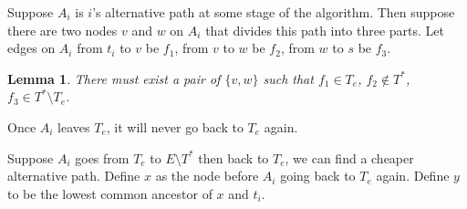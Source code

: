 \documentclass[11pt,psfig,times]{article}
\newtheorem{lemma}{Lemma}[section]
\begin{document}
Suppose \(A_i\) is \(i\)'s alternative path at some stage of the algorithm. Then suppose there are two nodes \(v\) and \(w\) on \(A_i\) that divides this path into three parts. Let edges on \(A_i\) from \(t_i\) to \(v\) be \(f_1\), from \(v\) to \(w\) be \(f_2\), from \(w\) to \(s\) be \(f_3\).
\begin{lemma}
	There must exist a pair of \(\{v,w\}\) such that \(f_1 \in T_e\), \(f_2 \notin T^*\), \(f_3 \in T^*\setminus T_e\).
\end{lemma}
Once \(A_i\) leaves \(T_e\), it will never go back to \(T_e\) again.
\begin{figure}
	\begin{center}
	\end{center}
\end{figure}
Suppose \(A_i\) goes from \(T_e\) to \(E\setminus T^*\) then back to \(T_e\), we can find a cheaper alternative path. 
Define \(x\) as the node before \(A_i\) going back to \(T_e\) again. 
Define \(y\) to be the lowest common ancestor of \(x\) and \(t_i\).
\end{document}
